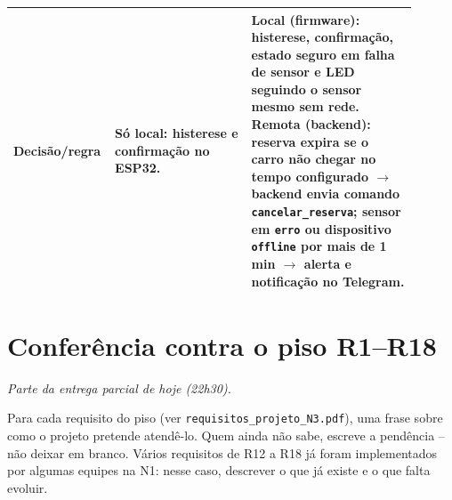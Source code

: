 \documentclass[11pt,a4paper]{article}
\newcommand{\parcial}{\textit{\small Parte da entrega parcial de hoje (22h30).}\par\medskip}
\newcommand{\cod}[1]{\texttt{#1}}
\begin{document}
\begin{longtable}{|p{0.17\linewidth}|p{0.33\linewidth}|p{0.40\linewidth}|}
Decisão/regra & Só local: histerese e confirmação no ESP32. & \textbf{Local (firmware):} histerese, confirmação, estado seguro em falha de sensor e LED seguindo o sensor mesmo sem rede. \textbf{Remota (backend):} reserva expira se o carro não chegar no tempo configurado $\rightarrow$ backend envia comando \cod{cancelar\_reserva}; sensor em \cod{erro} ou dispositivo \cod{offline} por mais de 1 min $\rightarrow$ alerta e notificação no Telegram. \\ \hline
\end{longtable}

\section{Conferência contra o piso R1--R18}
\parcial

Para cada requisito do piso (ver \cod{requisitos\_projeto\_N3.pdf}), uma frase sobre como o
projeto pretende atendê-lo. Quem ainda não sabe, escreve a pendência -- não deixar em
branco. Vários requisitos de R12 a R18 já foram implementados por algumas equipes na N1:
nesse caso, descrever o que já existe e o que falta evoluir.
\end{document}
